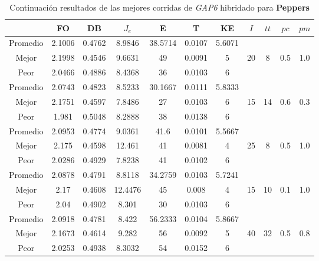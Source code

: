 \begin{table}[h!]
    \footnotesize
    \begin{center}
        \begin{tabular}{|c|c|c|c|c|c|c|c|c|c|c|}
        \hline
             & {\bf FO} & {\bf DB} & $J_e$ & {\bf E} & {\bf T} & {\bf KE} & $I$ & $tt$ & $pc$ & $pm$ \\
        \hline
        \hline
            Promedio  & 2.1006 & 0.4762 & 8.9846 & 38.5714 & 0.0107 & 5.6071 &  &  &  & \\
            \cline{1-7}
            Mejor & 2.1998 & 0.4546  & 9.6631 & 49 & 0.0091 & 5 & 20 & 8 & 0.5 & 1.0\\
            \cline{1-7}
            Peor & 2.0466 & 0.4886  & 8.4368 & 36 & 0.0103 & 6 &  &  &  & \\
        \hline
        \hline
            Promedio  & 2.0743 & 0.4823 & 8.5233 & 30.1667 & 0.0111 & 5.8333 &  &  &  & \\
            \cline{1-7}
            Mejor & 2.1751 & 0.4597  & 7.8486 & 27 & 0.0103 & 6 & 15 & 14 & 0.6 & 0.3\\
            \cline{1-7}
            Peor & 1.981 & 0.5048  & 8.2888 & 38 & 0.0138 & 6 &  &  &  & \\
        \hline
        \hline
            Promedio  & 2.0953 & 0.4774 & 9.0361 & 41.6 & 0.0101 & 5.5667 &  &  &  & \\
            \cline{1-7}
            Mejor & 2.175 & 0.4598  & 12.461 & 41 & 0.0081 & 4 & 25 & 8 & 0.5 & 1.0\\
            \cline{1-7}
            Peor & 2.0286 & 0.4929  & 7.8238 & 41 & 0.0102 & 6 &  &  &  & \\
        \hline
        \hline
            Promedio  & 2.0878 & 0.4791 & 8.8118 & 34.2759 & 0.0103 & 5.7241 &  &  &  & \\
            \cline{1-7}
            Mejor & 2.17 & 0.4608  & 12.4476 & 45 & 0.008 & 4 & 15 & 10 & 0.1 & 1.0\\
            \cline{1-7}
            Peor & 2.04 & 0.4902  & 8.301 & 30 & 0.0103 & 6 &  &  &  & \\
        \hline
        \hline
            Promedio  & 2.0918 & 0.4781 & 8.422 & 56.2333 & 0.0104 & 5.8667 &  &  &  & \\
            \cline{1-7}
            Mejor & 2.1673 & 0.4614  & 9.282 & 56 & 0.0092 & 5 & 40 & 32 & 0.5 & 0.8\\
            \cline{1-7}
            Peor & 2.0253 & 0.4938  & 8.3032 & 54 & 0.0152 & 6 &  &  &  & \\
        \hline
        \end{tabular}
        \caption{Continuaci\'on resultados de las mejores corridas de \emph{GAP6} hibridado para {\bf Peppers}}
        \label{tb:tablecGAP6}
    \end{center}
\end{table}
